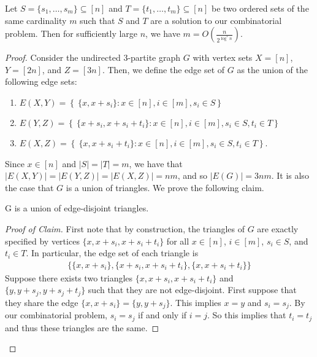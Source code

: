 \begin{theorem}\label{thm:comb-prob}
	Let $S = \{s_1,\dotsc,s_m\} \subseteq [n]$ and $T = \{t_1,\dotsc,t_m\} \subseteq [n]$ be two ordered sets of the same cardinality $m$ such that $S$ and $T$ are a solution to our combinatorial problem. Then for sufficiently large $n$, we have $m = O\left(\frac{n}{2^{\log^* n}}\right)$.
\end{theorem}
\begin{proof}
	Consider the undirected 3-partite graph $G$ with vertex sets $X = [n]$, $Y = [2n]$, and $Z = [3n]$. Then, we define the edge set of $G$ as the union of the following edge sets:
	\begin{enumerate}
		\item $E(X,Y) = \left\lbrace\ \{x, x+s_i\} \colon x\in[n], i\in[m], s_i \in S\right\rbrace$
		\item $E(Y,Z) = \left\lbrace\ \{x+s_i, x+s_i+t_i\} \colon x\in[n], i\in[m], s_i \in S, t_i \in T\right\rbrace$
		\item $E(X,Z) = \left\lbrace\ \{x, x+s_i+t_i\} \colon x\in[n], i\in[m], s_i \in S, t_i \in T\right\rbrace$.
	\end{enumerate}
	Since $x \in [n]$ and $|S| = |T| = m$, we have that $|E(X,Y)| = |E(Y,Z)| = |E(X,Z)| = nm$, and so $|E(G)| = 3nm$. It is also the case that $G$ is a union of triangles. We prove the following claim.
	\begin{claim}
		G is a union of edge-disjoint triangles.
	\end{claim}
	\begin{proof}[Proof of Claim]
		First note that by construction, the triangles of $G$ are exactly specified by vertices $\{x, x+s_i, x+s_i + t_i\}$ for all $x \in [n]$, $i \in [m]$, $s_i \in S$, and $t_i \in T$. In particular, the edge set of each triangle is
		\begin{align*}
			\{ \{x,x+s_i\}, \{x+s_i,x+s_i+t_i\}, \{x,x+s_i+t_i\} \}
		\end{align*}
		Suppose there exists two triangles $\{x,x+s_i,x+s_i+t_i\}$ and $\{y, y+s_j, y+s_j+t_j\}$ such that they are not edge-disjoint. First suppose that they share the edge $\{x,x+s_i\} = \{y,y+s_j\}$. This implies $x = y$ and $s_i = s_j$. By our combinatorial problem, $s_i = s_j$ if and only if $i = j$. So this implies that $t_i = t_j$ and thus these triangles are the same.
		

\end{proof}
\end{proof}
